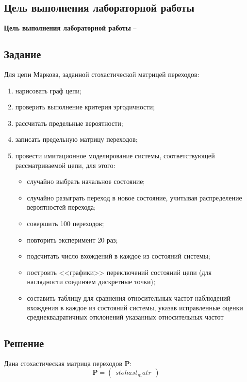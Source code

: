 \subsection{Цель выполнения лабораторной работы}\label{blockN.VariantM}
\textbf{Цель выполнения лабораторной работы }-- \GoalOfResearch

\subsection{Задание}
Для цепи Маркова, заданной стохастической матрицей переходов:
\begin{enumerate}
    \item нарисовать граф цепи;
    \item проверить выполнение критерия эргодичности;
    \item рассчитать предельные вероятности;
    \item записать предельную матрицу переходов;
    \item провести имитационное моделирование системы, соответствующей рассматриваемой цепи, для этого:
    \begin{itemize}
        \item случайно выбрать начальное состояние;
        \item случайно разыграть переход в новое состояние, учитывая распределение вероятностей перехода;
        \item совершить 100 переходов;
        \item повторить эксперимент 20 раз;
        \item подсчитать число вхождений в каждое из состояний системы;
        \item  построить <<графики>> переключений состояний цепи (для наглядности соединяем дискретные точки);
        \item составить таблицу для сравнения относительных частот наблюдений вхождения в каждое из состояний системы, указав исправленные оценки среднеквадратичных отклонений указанных относительных частот
    \end{itemize}
\end{enumerate}
\newpage
\subsection{Решение}
Дана стохастическая матрица переходов $\mathbf{P}$:
$$\mathbf{P}=\begin{pmatrix}
{{ stohast_matr }}
\end{pmatrix}$$

